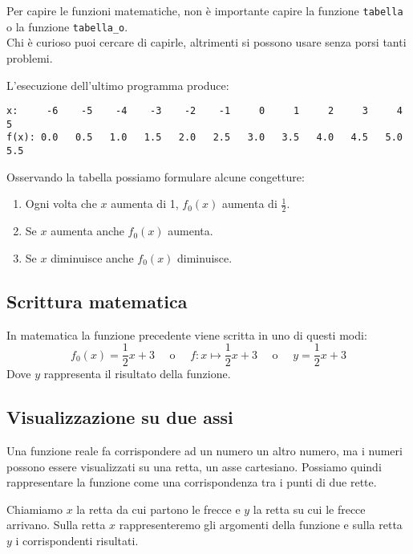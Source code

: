 \begin{osservazione}
Per capire le funzioni matematiche, non è importante capire 
la funzione \quad \texttt{tabella} \quad o la funzione \quad 
\texttt{tabella\_o}.\\
Chi è curioso puoi cercare di capirle, altrimenti si possono usare senza 
porsi tanti problemi.
\end{osservazione}

L'esecuzione dell'ultimo programma produce:
\begin{lstlisting}
x:     -6    -5    -4    -3    -2    -1     0     1     2     3     4     5 
f(x): 0.0   0.5   1.0   1.5   2.0   2.5   3.0   3.5   4.0   4.5   5.0   5.5 
\end{lstlisting}

Osservando la tabella possiamo formulare alcune congetture:

\begin{enumerate} [nosep]
\item Ogni volta che \(x\) aumenta di 1, \(f_0(x)\) aumenta di \(\frac{1}{2}\).
\item Se \(x\) aumenta anche \(f_0(x)\) aumenta.
\item Se \(x\) diminuisce anche \(f_0(x)\) diminuisce.
\end{enumerate}

\subsection{Scrittura matematica}

In matematica la funzione precedente viene scritta in uno di questi modi:
\[f_0(x) = \frac{1}{2}x +3 \quad \text{ o } \quad 
f: x \mapsto \frac{1}{2}x +3 \quad \text{ o } \quad 
y= \frac{1}{2}x +3\]
Dove \(y\) rappresenta il risultato della funzione.

\subsection{Visualizzazione su due assi}

Una funzione reale fa corrispondere ad un numero un altro numero, ma i 
numeri possono essere visualizzati su una retta, un asse cartesiano. 
Possiamo quindi rappresentare la funzione come una corrispondenza tra i 
punti di due rette.

Chiamiamo \(x\) la retta da cui partono le frecce e \(y\) la retta su cui le 
frecce arrivano.
Sulla retta \(x\) rappresenteremo gli argomenti della funzione e sulla retta 
\(y\) i corrispondenti risultati.

